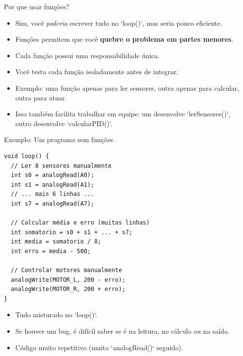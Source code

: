 \documentclass[10pt]{beamer}
\begin{document}
\begin{frame}{Por que usar funções?}
  \begin{itemize}
    \item Sim, você \textit{poderia} escrever tudo no `loop()`, mas seria pouco eficiente.
    \item Funções permitem que você \textbf{quebre o problema em partes menores}.
    \item Cada função possui uma responsabilidade única.
    \item Você testa cada função isoladamente antes de integrar.
    \item Exemplo: uma função apenas para ler sensores, outra apenas para calcular, outra para atuar.
    \item Isso também facilita trabalhar em equipe: um desenvolve `lerSensores()`, outro desenvolve `calcularPID()`.
  \end{itemize}
\end{frame}

\begin{frame}[fragile]{Exemplo: Um programa sem funções}
\begin{lstlisting}
void loop() {
  // Ler 8 sensores manualmente
  int s0 = analogRead(A0);
  int s1 = analogRead(A1);
  // ... mais 6 linhas ...
  int s7 = analogRead(A7);
  
  // Calcular média e erro (muitas linhas)
  int somatorio = s0 + s1 + ... + s7;
  int media = somatorio / 8;
  int erro = media - 500;
  
  // Controlar motores manualmente
  analogWrite(MOTOR_L, 200 - erro);
  analogWrite(MOTOR_R, 200 + erro);
}
\end{lstlisting}

  \begin{itemize}
    \item Tudo misturado no `loop()`.
    \item Se houver um bug, é difícil saber se é na leitura, no cálculo ou na saída.
    \item Código muito repetitivo (muito `analogRead()` seguido).
  \end{itemize}
\end{frame}
\end{document}
